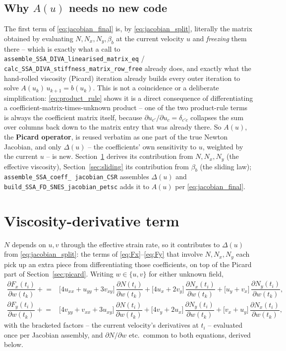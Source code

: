 \documentclass[11pt]{article}
\newcommand{\code}[1]{\texttt{#1}}
\newcommand{\ti}{t_i}
\newcommand{\tk}{t_k}
\newcommand{\pd}[2]{\dfrac{\partial #1}{\partial #2}}
\begin{document}
\subsection{Why $A(u)$ needs no new code}

The first term of \eqref{eq:jacobian_final} is, by \eqref{eq:jacobian_split},
literally the matrix obtained by evaluating $N,N_x,N_y,\beta_b$ at the current
velocity $u$ and \emph{freezing} them there -- which is exactly what a call to
\code{assemble\_\allowbreak SSA\_\allowbreak DIVA\_\allowbreak linearised\_\allowbreak matrix\_\allowbreak eq} /
\code{calc\_\allowbreak SSA\_\allowbreak DIVA\_\allowbreak stiffness\_\allowbreak matrix\_\allowbreak row\_\allowbreak free} already does, and
exactly what the hand-rolled viscosity (Picard) iteration already builds every
outer iteration to solve $A(u_k)\,u_{k+1}=b(u_k)$. This is not a coincidence
or a deliberate simplification: \eqref{eq:product_rule} shows it is a direct
consequence of differentiating a coefficient-matrix-times-unknown product --
one of the two product-rule terms is always the coefficient matrix itself,
because $\partial u_{c'}/\partial u_c=\delta_{c'c}$ collapses the sum over
columns back down to the matrix entry that was already there. So $A(u)$, the
\textbf{Picard operator}, is reused verbatim as one part of the true Newton
Jacobian, and only $\Delta(u)$ -- the coefficients' own sensitivity to $u$,
weighted by the current $u$ -- is new. Section~\ref{sec:visc} derives its
contribution from $N,N_x,N_y$ (the effective viscosity), Section~\ref{sec:sliding}
its contribution from $\beta_b$ (the sliding law); \code{assemble\_\allowbreak SSA\_\allowbreak coeff\_\allowbreak
jacobian\_\allowbreak CSR} assembles $\Delta(u)$ and
\code{build\_\allowbreak SSA\_\allowbreak FD\_\allowbreak SNES\_\allowbreak jacobian\_\allowbreak petsc} adds it to $A(u)$ per
\eqref{eq:jacobian_final}.

\section{Viscosity-derivative term}
\label{sec:visc}

$N$ depends on $u,v$ through the effective strain rate, so it contributes to
$\Delta(u)$ from \eqref{eq:jacobian_split}: the terms of
\eqref{eq:Fx}--\eqref{eq:Fy} that involve $N,N_x,N_y$ each pick up an extra
piece from differentiating those coefficients, on top of the Picard part of
Section~\ref{sec:picard}. Writing $w\in\{u,v\}$ for either unknown field,
\begin{align}
\pd{F_x(\ti)}{w(\tk)} \mathrel{+}= {}&
  \big[4u_{xx}+u_{yy}+3v_{xy}\big]\,\pd{N(\ti)}{w(\tk)}
  + \big[4u_x+2v_y\big]\,\pd{N_x(\ti)}{w(\tk)}
  + \big[u_y+v_x\big]\,\pd{N_y(\ti)}{w(\tk)}, \label{eq:visc_Fx}\\[4pt]
\pd{F_y(\ti)}{w(\tk)} \mathrel{+}= {}&
  \big[4v_{yy}+v_{xx}+3u_{xy}\big]\,\pd{N(\ti)}{w(\tk)}
  + \big[4v_y+2u_x\big]\,\pd{N_y(\ti)}{w(\tk)}
  + \big[v_x+u_y\big]\,\pd{N_x(\ti)}{w(\tk)}, \label{eq:visc_Fy}
\end{align}
with the bracketed factors -- the current velocity's derivatives at $\ti$ --
evaluated once per Jacobian assembly, and $\partial N/\partial w$ etc.\ common
to both equations, derived below.
\end{document}
